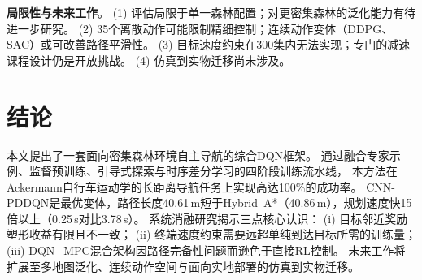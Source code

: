 \documentclass[conference]{IEEEtran}
\begin{document}
\textbf{局限性与未来工作}。
(1) 评估局限于单一森林配置；对更密集森林的泛化能力有待进一步研究。
(2) 35个离散动作可能限制精细控制；连续动作变体（DDPG、SAC）或可改善路径平滑性。
(3) 目标速度约束在300集内无法实现；专门的减速课程设计仍是开放挑战。
(4) 仿真到实物迁移尚未涉及。

\section{结论}\label{sec:conclusion}

本文提出了一套面向密集森林环境自主导航的综合DQN框架。
通过融合专家示例、监督预训练、引导式探索与时序差分学习的四阶段训练流水线，
本方法在Ackermann自行车运动学的长距离导航任务上实现高达100\%的成功率。
CNN-PDDQN是最优变体，路径长度40.61\,m短于Hybrid~A*（40.86\,m），规划速度快15倍以上（0.25\,s对比3.78\,s）。
系统消融研究揭示三点核心认识：
(i) 目标邻近奖励塑形收益有限且不一致；
(ii) 终端速度约束需要远超单纯到达目标所需的训练量；
(iii) DQN+MPC混合架构因路径完备性问题而逊色于直接RL控制。
未来工作将扩展至多地图泛化、连续动作空间与面向实地部署的仿真到实物迁移。



\end{document}

